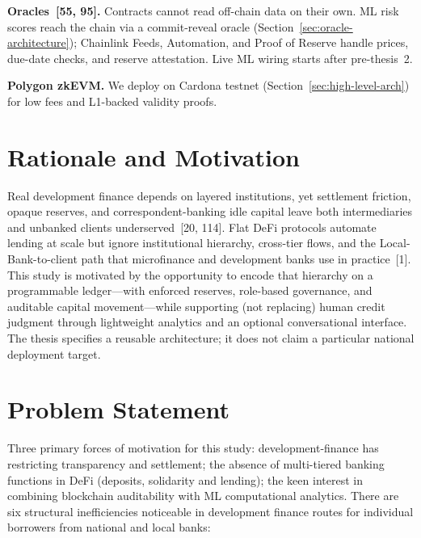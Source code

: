 \documentclass[12pt, a4paper]{report}
\begin{document}
\textbf{Oracles~[55, 95].} Contracts cannot read off-chain data on their own. ML risk scores reach the chain via a commit-reveal oracle (Section~\ref{sec:oracle-architecture}); Chainlink Feeds, Automation, and Proof of Reserve handle prices, due-date checks, and reserve attestation. Live ML wiring starts after pre-thesis~2.

\textbf{Polygon zkEVM.} We deploy on Cardona testnet (Section~\ref{sec:high-level-arch}) for low fees and L1-backed validity proofs.

\section{Rationale and Motivation}
\label{sec:rationale}

Real development finance depends on layered institutions, yet settlement friction, opaque reserves, and correspondent-banking idle capital leave both intermediaries and unbanked clients underserved~[20, 114]. Flat DeFi protocols automate lending at scale but ignore institutional hierarchy, cross-tier flows, and the Local-Bank-to-client path that microfinance and development banks use in practice~[1]. This study is motivated by the opportunity to encode that hierarchy on a programmable ledger---with enforced reserves, role-based governance, and auditable capital movement---while supporting (not replacing) human credit judgment through lightweight analytics and an optional conversational interface. The thesis specifies a reusable architecture; it does not claim a particular national deployment target.

\section{Problem Statement}

Three primary forces of motivation for this study: development-finance has restricting transparency and settlement; the absence of multi-tiered banking functions in DeFi (deposits, solidarity and lending); the keen interest in combining blockchain auditability with ML computational analytics. There are six structural inefficiencies noticeable in development finance routes for individual borrowers from national and local banks:
\end{document}
